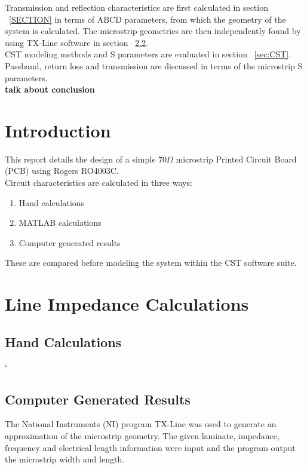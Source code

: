 \documentclass{paper}
\begin{document}
Transmission and reflection characteristics are first calculated in section ~\ref{SECTION} in terms of ABCD parameters, from which the geometry of the system is calculated. The microstrip geometries are then independently found by using TX-Line software in section ~\ref{sec:tx-line}.\\

CST modeling methods and S parameters are evaluated in section ~\ref{sec:CST}. Passband, return loss and transmission are discussed in terms of the microstrip S parameters.\\

\textbf{talk about conclusion}

\newpage
\tableofcontents

\newpage
\section{Introduction}
This report details the design of a simple 70$\Omega$ microstrip Printed Circuit Board (PCB) using Rogers RO4003C. \\

Circuit characteristics are calculated in three ways:

\begin{enumerate}
	\item Hand calculations
	\item MATLAB calculations
	\item Computer generated results\\
\end{enumerate}

These are compared before modeling the system within the CST software suite.\\

\newpage
\section{Line Impedance Calculations}
\subsection{Hand Calculations}
`

\subsection{Computer Generated Results}
\label{sec:tx-line}
The National Instruments (NI) program TX-Line was used to generate an approximation of the microstrip geometry. The given laminate, impedance, frequency and electrical length information were input and the program output the microstrip width and length. \\
\end{document}
